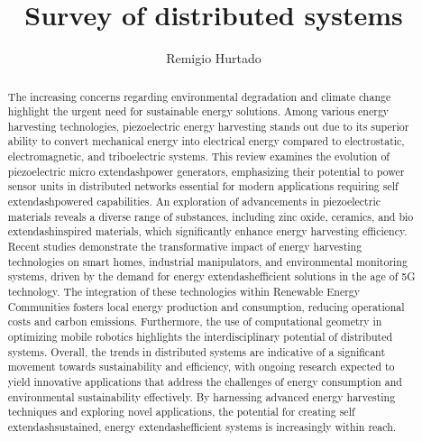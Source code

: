\documentclass[runningheads]{llncs}
\begin{document}
%
\title{Survey of  distributed systems}
%
%
\author{Remigio Hurtado}
%
%
%
\maketitle    
%
\begin{abstract}
The increasing concerns regarding environmental degradation and climate change highlight the urgent need for sustainable energy solutions. Among various energy harvesting technologies, piezoelectric energy harvesting stands out due to its superior ability to convert mechanical energy into electrical energy compared to electrostatic, electromagnetic, and triboelectric systems. This review examines the evolution of piezoelectric micro	extendash{}power generators, emphasizing their potential to power sensor units in distributed networks essential for modern applications requiring self	extendash{}powered capabilities. An exploration of advancements in piezoelectric materials reveals a diverse range of substances, including zinc oxide, ceramics, and bio	extendash{}inspired materials, which significantly enhance energy harvesting efficiency. Recent studies demonstrate the transformative impact of energy harvesting technologies on smart homes, industrial manipulators, and environmental monitoring systems, driven by the demand for energy	extendash{}efficient solutions in the age of 5G technology. The integration of these technologies within Renewable Energy Communities fosters local energy production and consumption, reducing operational costs and carbon emissions. Furthermore, the use of computational geometry in optimizing mobile robotics highlights the interdisciplinary potential of distributed systems. Overall, the trends in distributed systems are indicative of a significant movement towards sustainability and efficiency, with ongoing research expected to yield innovative applications that address the challenges of energy consumption and environmental sustainability effectively. By harnessing advanced energy harvesting techniques and exploring novel applications, the potential for creating self	extendash{}sustained, energy	extendash{}efficient systems is increasingly within reach.
\end{abstract}
\end{document}
